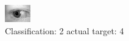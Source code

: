 \begin{figure}[h!]
\begin{center}
\includegraphics[width=0.60\columnwidth]{figures/ID785_class_2_target_4.png}
\end{center}
\caption{ Classification: 2 actual target: 4}
\label{fig:ID785_class_2_target_4}
\end{figure}
